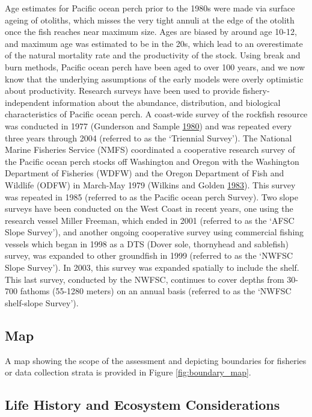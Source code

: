 \documentclass[12pt,]{article}
\begin{document}
Age estimates for Pacific ocean perch prior to the 1980s were made via
surface ageing of otoliths, which misses the very tight annuli at the
edge of the otolith once the fish reaches near maximum size. Ages are
biased by around age 10-12, and maximum age was estimated to be in the
20s, which lead to an overestimate of the natural mortality rate and the
productivity of the stock. Using break and burn methods, Pacific ocean
perch have been aged to over 100 years, and we now know that the
underlying assumptions of the early models were overly optimistic about
productivity. Research surveys have been used to provide
fishery-independent information about the abundance, distribution, and
biological characteristics of Pacific ocean perch. A coast-wide survey
of the rockfish resource was conducted in 1977 (Gunderson and Sample
\protect\hyperlink{ref-gunderson_distribution_1980}{1980}) and was
repeated every three years through 2004 (referred to as the `Triennial
Survey'). The National Marine Fisheries Service (NMFS) coordinated a
cooperative research survey of the Pacific ocean perch stocks off
Washington and Oregon with the Washington Department of Fisheries (WDFW)
and the Oregon Department of Fish and Wildlife (ODFW) in March-May 1979
(Wilkins and Golden
\protect\hyperlink{ref-wilkins_condition_1983}{1983}). This survey was
repeated in 1985 (referred to as the Pacific ocean perch Survey). Two
slope surveys have been conducted on the West Coast in recent years, one
using the research vessel Miller Freeman, which ended in 2001 (referred
to as the `AFSC Slope Survey'), and another ongoing cooperative survey
using commercial fishing vessels which began in 1998 as a DTS (Dover
sole, thornyhead and sablefish) survey, was expanded to other groundfish
in 1999 (referred to as the `NWFSC Slope Survey'). In 2003, this survey
was expanded spatially to include the shelf. This last survey, conducted
by the NWFSC, continues to cover depths from 30-700 fathoms (55-1280
meters) on an annual basis (referred to as the `NWFSC shelf-slope
Survey').

\subsection{Map}\label{map}

A map showing the scope of the assessment and depicting boundaries for
fisheries or data collection strata is provided in Figure
\ref{fig:boundary_map}.

\subsection{Life History and Ecosystem
Considerations}\label{life-history-and-ecosystem-considerations}
\end{document}
